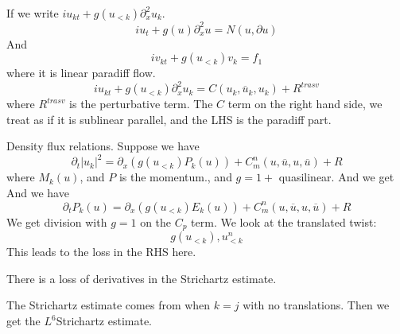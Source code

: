 If we write $iu_{kt}+g(u_{<k})\partial_x^2 u_k$. 
\begin{equation*}
    iu_t+g(u)\partial_x^2u=N(u, \partial u)
\end{equation*}
And 
\begin{equation*}
    iv_{kt}+g(u_{<k})v_k=f_1
\end{equation*}
where it is linear paradiff flow.
\begin{equation*}
    iu_{kt}+g(u_{<k})\partial_x^2u_k=C(u_k, \overline{u}_k, u_k)+R^{trasv}
\end{equation*}
where $R^{trasv}$ is the perturbative term.
The $C$ term on the right hand side, we treat as if it is sublinear parallel, and the LHS is the paradiff part.

Density flux relations. Suppose we have 
\begin{equation*}
    \partial_t|u_k|^2=\partial_x\left( g(u_{<k})P_k(u)\right)+C_m^n(u, \overline{u}, u, \overline{u})+R
\end{equation*}
where $M_k(u)$, and $P$ is the momentum., and $g=1+$ quasilinear. And we get 
And we have 
\begin{equation*}
    \partial_t P_k(u)=\partial_x\left( g(u_{<k})E_k(u)\right)+C_m^n(u, \overline{u}, u, \overline{u})+R
\end{equation*}
We get division with $g=1$ on the $C_p$ term. We look at the translated twist:
\begin{equation*}
    g(u_{<k}), u_{<k}^n
\end{equation*}
This leads to the loss in the RHS here.
\begin{note}
    There is a loss of derivatives in the Strichartz estimate. 
\end{note}
The Strichartz estimate comes from when $k=j$ with no translations. Then we get the $L^6$Strichartz estimate.

